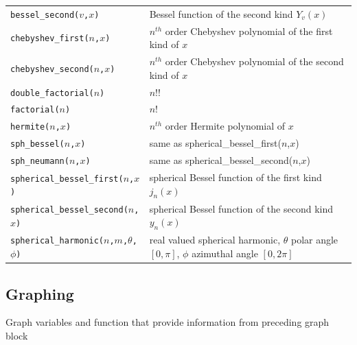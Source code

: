 \begin{supertabular}{lp{10cm}}
  {\tt bessel\_second($v$,$x$)}  & Bessel function of the second kind $Y_v(x)$ \\
  {\tt chebyshev\_first($n$,$x$)}  & $n^{th}$ order Chebyshev polynomial of the first kind of $x$ \\
  {\tt chebyshev\_second($n$,$x$)}  & $n^{th}$ order Chebyshev polynomial of the second kind of $x$ \\
  {\tt double\_factorial($n$)}  & $n!!$ \\
  {\tt factorial($n$)}  & $n!$ \\
  {\tt hermite($n$,$x$)}  & $n^{th}$ order Hermite polynomial of $x$ \\
  {\tt sph\_bessel($n$,$x$)}  & same as spherical\_bessel\_first($n$,$x$) \\
  {\tt sph\_neumann($n$,$x$)}  & same as spherical\_bessel\_second($n$,$x$) \\
  {\tt spherical\_bessel\_first($n$,$x$)}  & spherical Bessel function of the first kind $j_n(x)$ \\
  {\tt spherical\_bessel\_second($n$,$x$)}  & spherical Bessel function of the second kind $y_n(x)$ \\
  {\tt spherical\_harmonic($n$,$m$,$\theta$,$\phi$)}  & real valued spherical harmonic, $\theta$ polar angle $[0,\pi]$, $\phi$ azimuthal angle $[0,2\pi]$ \\
\end{supertabular}

\subsection{Graphing}

Graph variables and function that provide information from preceding graph block

